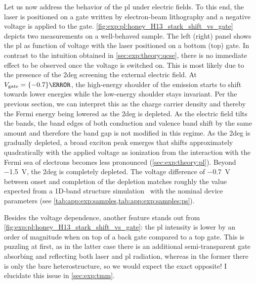 Let us now address the behavior of the \gls{pl} under electric fields.
To this end, the laser is positioned on a gate written by electron-beam lithography and a negative voltage is applied to the gate.
\cref{fig:exp:pl:honey_H13_stark_shift_vs_gate} depicts two measurements on a well-behaved sample.
The left (right) panel shows the \gls{pl} as function of voltage with the laser positioned on a bottom (top) gate.
In contrast to the intuition obtained in \cref{sec:exp:theory:qcse}, there is no immediate effect to be observed once the voltage is switched on.
This is most likely due to the presence of the \gls{2deg} screening the external electric field. %
At $V_{\mr{gate}} = \qty{-0.7}{\volt}$, the high-energy shoulder of the emission starts to shift towards lower energies while the low-energy shoulder stays invariant.
Per the previous section, we can interpret this as the charge carrier density and thereby the Fermi energy being lowered as the \gls{2deg} is depleted.
As the electric field tilts the bands, the band edges of both conduction and valence band shift by the same amount and therefore the band gap is not modified in this regime.
As the \gls{2deg} is gradually depleted, a broad exciton peak emerges that shifts approximately quadratically with the applied voltage as ionization from the interaction with the Fermi sea of electrons becomes less pronounced (\cf \cref{sec:exp:theory:pl}).
Beyond \qty{-1.5}{\volt}, the \gls{2deg} is completely depleted.
The voltage difference of \qty{-0.7}{\volt} between onset and completion of the depletion matches roughly the value expected from a 1D-band structure simulation~\cite{PoissonSchroedinger} with the nominal device parameters (see \cref{tab:app:exp:samples,tab:app:exp:samples:ps}).

Besides the voltage dependence, another feature stands out from \cref{fig:exp:pl:honey_H13_stark_shift_vs_gate}: the \gls{pl} intensity is lower by an order of magnitude when on top of a back gate compared to a top gate.
This is puzzling at first, as in the latter case there is an additional semi-transparent gate
absorbing and reflecting both laser and \gls{pl} radiation, whereas in the former there is only the bare heterostructure, so we would expect the exact opposite!
I elucidate this issue in \cref{sec:exp:tmm}.

